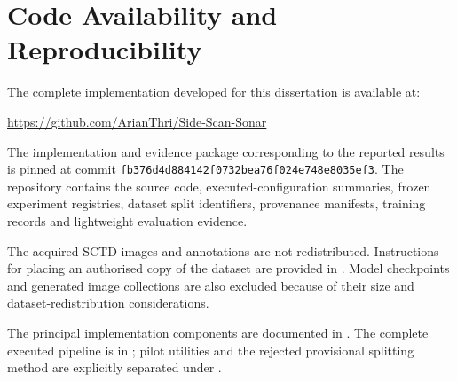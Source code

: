 \chapter{Code Availability and Reproducibility}
\label{app:code}

The complete implementation developed for this dissertation is available at:

\begin{center}
\url{https://github.com/ArianThri/Side-Scan-Sonar}
\end{center}

The implementation and evidence package corresponding to the reported results
is pinned at commit
\texttt{fb376d4d884142f0732bea76f024e748e8035ef3}. The repository contains the
source code, executed-configuration summaries, frozen experiment registries,
dataset split identifiers, provenance manifests, training records and
lightweight evaluation evidence.

The acquired SCTD images and annotations are not redistributed. Instructions
for placing an authorised copy of the dataset are provided in
. Model checkpoints and generated image collections are also
excluded because of their size and dataset-redistribution considerations.

The principal implementation components are documented in
. The complete executed pipeline is in ; pilot
utilities and the rejected provisional splitting method are explicitly
separated under .
